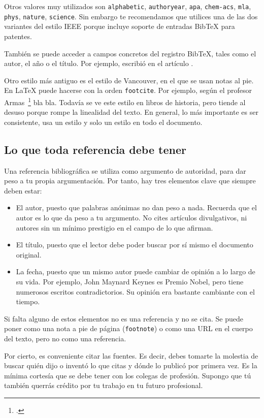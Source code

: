 Otros valores muy utilizados son \texttt{alphabetic}, \texttt{authoryear}, \texttt{apa}, \texttt{chem-acs}, \texttt{mla}, \texttt{phys}, \texttt{nature}, \texttt{science}.  Sin embargo te recomendamos que utilices una de las dos variantes del estilo IEEE porque incluye soporte de entradas BibTeX para patentes.

También se puede acceder a campos concretos del registro BibTeX, tales como el autor, el año o el título.  Por ejemplo, \citeauthor{armas2011estimation} escribió en \citeyear{armas2011estimation} el artículo .

Otro estilo más antiguo es el estilo de Vancouver, en el que se usan notas al pie.  En \LaTeX{} puede hacerse con la orden \texttt{footcite}.  Por ejemplo, según el profesor Armas~\footcite[3]{armas2011estimation} bla bla.  Todavía se ve este estilo en libros de historia, pero tiende al desuso porque rompe la linealidad del texto. En general, lo más importante es ser consistente, usa un estilo y solo un estilo en todo el documento.

\subsection{Lo que toda referencia debe tener}

Una referencia bibliográfica se utiliza como argumento de autoridad, para dar peso a tu propia argumentación.  Por tanto, hay tres elementos clave que siempre deben estar: 
\begin{itemize}
    \item El autor, puesto que palabras anónimas no dan peso a nada.  Recuerda que el autor es lo que da peso a tu argumento.  No cites artículos divulgativos, ni autores sin un mínimo prestigio en el campo de lo que afirman.
    \item El título, puesto que el lector debe poder buscar por sí mismo el documento original.
    \item La fecha, puesto que un mismo autor puede cambiar de opinión a lo largo de su vida.  Por ejemplo,  John Maynard Keynes es Premio Nobel, pero tiene numerosos escritos contradictorios.  Su opinión era bastante cambiante con el tiempo.
\end{itemize}

Si falta alguno de estos elementos no es una referencia y no se cita.  Se puede poner como una nota a pie de página (\texttt{footnote}) o como una URL en el cuerpo del texto, pero no como una referencia.

Por cierto, es conveniente citar las fuentes.  Es decir, debes tomarte la molestia de buscar quién dijo o inventó lo que citas y dónde lo publicó por primera vez.  Es la mínima cortesía que se debe tener con los colegas de profesión.  Supongo que tú también querrás crédito por tu trabajo en tu futuro profesional.

